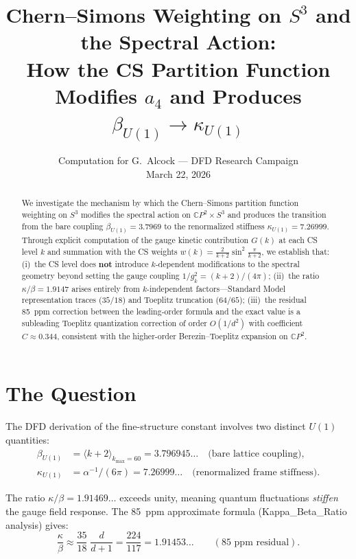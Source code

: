 \documentclass[12pt,a4paper]{article}
\title{Chern--Simons Weighting on $S^3$ and the Spectral Action:\\[6pt]
\large How the CS Partition Function Modifies $a_4$ and Produces
$\beta_{U(1)} \to \kappa_{U(1)}$}
\author{Computation for G.\ Alcock --- DFD Research Campaign\\
March 22, 2026}
\date{}
\theoremstyle{definition}
\theoremstyle{remark}
\begin{document}
\maketitle

\begin{abstract}
We investigate the mechanism by which the Chern--Simons partition function
weighting on $S^3$ modifies the spectral action on $\mathbb{C}P^2 \times S^3$
and produces the transition from the bare coupling
$\beta_{U(1)} = 3.7969$ to the renormalized stiffness
$\kappa_{U(1)} = 7.26999$.  Through explicit computation of the gauge kinetic
contribution $G(k)$ at each CS level $k$ and summation with the CS weights
$w(k) = \frac{2}{k+2}\sin^2\!\frac{\pi}{k+2}$, we establish that:
(i)~the CS level does \textbf{not} introduce $k$-dependent modifications to
the spectral geometry beyond setting the gauge coupling $1/g_k^2 = (k+2)/(4\pi)$;
(ii)~the ratio $\kappa/\beta = 1.9147$ arises entirely from $k$-independent
factors---Standard Model representation traces ($35/18$) and Toeplitz
truncation ($64/65$);
(iii)~the residual 85~ppm correction between the leading-order formula and
the exact value is a subleading Toeplitz quantization correction of order
$O(1/d^2)$ with coefficient $C \approx 0.344$, consistent with the
higher-order Berezin--Toeplitz expansion on $\mathbb{C}P^2$.
\end{abstract}

\tableofcontents
\newpage

\section{The Question}
\label{sec:question}

The DFD derivation of the fine-structure constant involves two distinct
$U(1)$ quantities:
\begin{align}
\beta_{U(1)} &= \langle k+2 \rangle_{k_{\max}=60} = 3.796945\ldots
\quad \text{(bare lattice coupling)}, \\
\kappa_{U(1)} &= \alpha^{-1}/(6\pi) = 7.26999\ldots
\quad \text{(renormalized frame stiffness)}.
\end{align}

The ratio $\kappa/\beta = 1.91469\ldots$ exceeds unity, meaning quantum
fluctuations \emph{stiffen} the gauge field response.  The 85~ppm approximate
formula (Kappa\_Beta\_Ratio analysis) gives:
\begin{equation}
\frac{\kappa}{\beta} \approx \frac{35}{18}\;\frac{d}{d+1}
= \frac{224}{117} = 1.91453\ldots
\qquad (\text{85~ppm residual}).
\end{equation}
\end{document}
